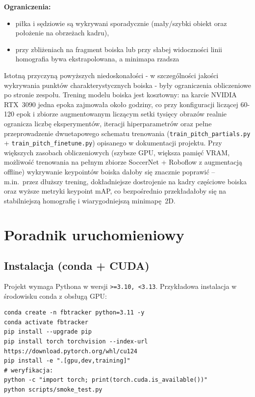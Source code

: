 \documentclass[11pt,a4paper]{article}
\begin{document}
\textbf{Ograniczenia:}
\begin{itemize}[nosep]
  \item piłka i sędziowie są wykrywani sporadycznie (mały/szybki obiekt oraz
        położenie na obrzeżach kadru),
  \item przy zbliżeniach na fragment boiska lub przy słabej widoczności linii
        homografia bywa ekstrapolowana, a minimapa rzadsza
\end{itemize}

Istotną przyczyną powyższych niedoskonałości - w szczególności jakości
wykrywania punktów charakterystycznych boiska - były ograniczenia
obliczeniowe po stronie zespołu. Trening modelu boiska jest kosztowny: na
karcie NVIDIA RTX~3090 jedna epoka zajmowała około godziny, co przy
konfiguracji liczącej 60-120 epok i zbiorze augmentowanym liczącym setki
tysięcy obrazów realnie ogranicza liczbę eksperymentów, iteracji
hiperparametrów oraz pełne przeprowadzenie dwuetapowego schematu trenowania
(\texttt{train\_pitch\_partials.py} + \texttt{train\_pitch\_finetune.py})
opisanego w dokumentacji projektu. Przy większych zasobach obliczeniowych
(szybsze GPU, większa pamięć VRAM, możliwość trenowania na pełnym zbiorze
SoccerNet + Roboflow z augmentacją offline) wykrywanie keypointów boiska dałoby
się znacznie poprawić -- m.in.\ przez dłuższy trening, dokładniejsze
dostrojenie na kadry częściowe boiska oraz wyższe metryki keypoint mAP, co
bezpośrednio przekładałoby się na stabilniejszą homografię i wiarygodniejszą
minimapę~2D.

\section{Poradnik uruchomieniowy}

\subsection{Instalacja (conda + CUDA)}

Projekt wymaga Pythona w wersji \texttt{>=3.10, <3.13}. Przykładowa instalacja w
środowisku conda z obsługą GPU:

\begin{lstlisting}[style=sh]
conda create -n fbtracker python=3.11 -y
conda activate fbtracker
pip install --upgrade pip
pip install torch torchvision --index-url https://download.pytorch.org/whl/cu124
pip install -e ".[gpu,dev,training]"
# weryfikacja:
python -c "import torch; print(torch.cuda.is_available())"
python scripts/smoke_test.py
\end{lstlisting}
\end{document}
